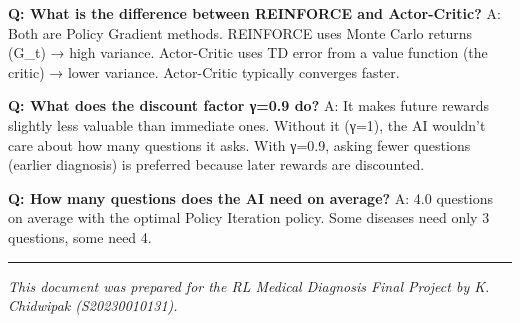 \documentclass[
]{article}
\begin{document}
\textbf{Q: What is the difference between REINFORCE and Actor-Critic?}
A: Both are Policy Gradient methods. REINFORCE uses Monte Carlo returns
(G\_t) → high variance. Actor-Critic uses TD error from a value function
(the critic) → lower variance. Actor-Critic typically converges faster.

\textbf{Q: What does the discount factor γ=0.9 do?} A: It makes future
rewards slightly less valuable than immediate ones. Without it (γ=1),
the AI wouldn't care about how many questions it asks. With γ=0.9,
asking fewer questions (earlier diagnosis) is preferred because later
rewards are discounted.

\textbf{Q: How many questions does the AI need on average?} A: 4.0
questions on average with the optimal Policy Iteration policy. Some
diseases need only 3 questions, some need 4.

\begin{center}\rule{0.5\linewidth}{0.5pt}\end{center}

\emph{This document was prepared for the RL Medical Diagnosis Final
Project by K. Chidwipak (S20230010131).}
\end{document}
